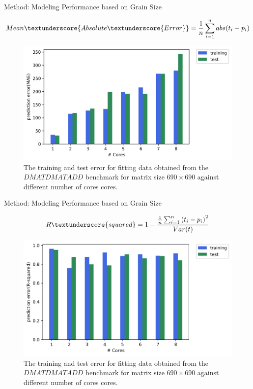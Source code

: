 \documentclass[10pt]{beamer}
\begin{document}
\begin{frame}{Method: Modeling Performance based on Grain Size}
	\begin{outline}	
		$$Mean\textunderscore{Absolute\textunderscore{Error}} = \frac{1}{n}\sum_{i=1}^{n} abs({t_i-p_i})$$
		\begin{figure}[H]
			\centering
			\includegraphics[scale=.5]{images/polyfit/error_690_mae.png}
			\caption{The training and test error for fitting data obtained from the $DMATDMATADD$ benchmark for matrix size $690\times690$ against different number of cores cores.}	
			\label{fig32}
		\end{figure}
	\end{outline}
\end{frame}

\begin{frame}{Method: Modeling Performance based on Grain Size}
	\begin{outline}	
		$$R\textunderscore{squared} = 1-\frac{{\frac{1}{n}\sum_{i=1}^{n}{(t_i-p_i)}^2}}{Var(t)}$$
		\begin{figure}[H]
			\centering
			\includegraphics[scale=.5]{images/polyfit/error_690_r2.png}
			\caption{The training and test error for fitting data obtained from the $DMATDMATADD$ benchmark for matrix size $690\times690$ against different number of cores cores.}	
			\label{fig33}
		\end{figure}
	\end{outline}
\end{frame}
\end{document}
